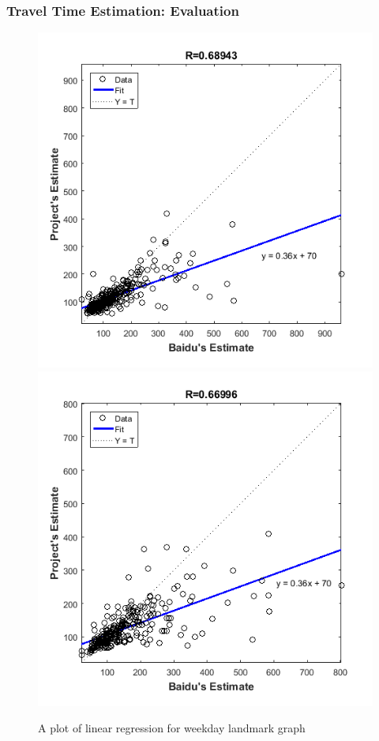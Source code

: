 \documentclass{beamer}
\theoremstyle{definition}
\begin{document}
\begin{frame}
\frametitle{Travel Time Estimation: Evaluation}
\begin{figure}[h!]
\centering
\includegraphics[scale = 0.4]{wrkd_50m_reg}
\includegraphics[scale = 0.4]{wrkd_30m_reg}
\caption{A plot of linear regression for weekday landmark graph}
\label{Fig:wrkd_reg}
\end{figure}
\end{frame}
\end{document}

